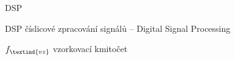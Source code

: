 \begin{seznamzkratek}{DSP}

		{DSP}								%
		{číslicové zpracování signálů -- Digital Signal Processing}

		{\ensuremath{f_\textind{vz}}} %
		{vzorkovací kmitočet}					%
		
\end{seznamzkratek}
